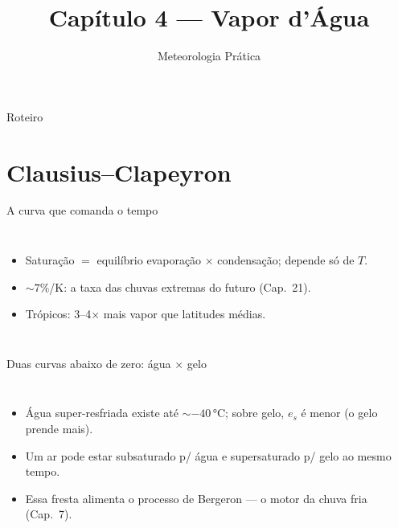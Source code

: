 \documentclass[aspectratio=169,11pt]{beamer}
\title[Cap. 4 --- Vapor d'Água]{Capítulo 4 --- Vapor d'Água}
\subtitle{Meteorologia Prática}
\author{}
\date{}
\begin{document}
\begin{frame}
  \titlepage
  \vfill
  \atribuicao
\end{frame}

\begin{frame}{Roteiro}
  \tableofcontents
\end{frame}

\section{Clausius--Clapeyron}

\begin{frame}{A curva que comanda o tempo}
  \begin{columns}
    \vspace{0.4em}
    \begin{itemize}
      \item Saturação $=$ equilíbrio evaporação × condensação; depende
            \alert{só de $T$}.
      \item $\sim 7\%$/K: a taxa das chuvas extremas do futuro
            (Cap.~21).
      \item Trópicos: 3--4$\times$ mais vapor que latitudes médias.
    \end{itemize}
  \end{columns}
\end{frame}

\begin{frame}{Duas curvas abaixo de zero: água × gelo}
  \begin{columns}
    \begin{itemize}
      \item Água super-resfriada existe até $\sim-40\,°$C; sobre gelo,
            $e_s$ é \alert{menor} (o gelo prende mais).
      \item Um ar pode estar subsaturado p/ água e supersaturado p/
            gelo \alert{ao mesmo tempo}.
      \item Essa fresta alimenta o processo de Bergeron — o motor da
            chuva fria (Cap.~7).
    \end{itemize}
  \end{columns}
\end{frame}
\end{document}
